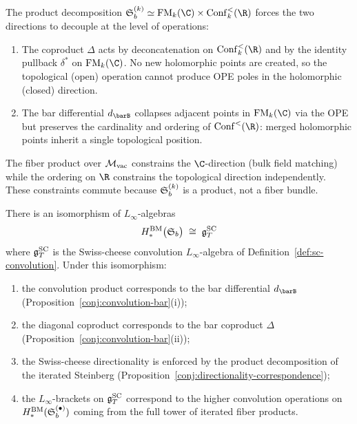 \begin{remark}[Evidence]
The product decomposition
$\Steinb_b^{(k)} \simeq \FM_k(\C) \times \Conf_k^{<}(\R)$
forces the two directions to decouple at the level of operations:
\begin{enumerate}[label=(\roman*)]
\item The coproduct $\Delta$ acts by deconcatenation on
 $\Conf_k^{<}(\R)$ and by the identity pullback $\delta^*$ on
 $\FM_k(\C)$. No new holomorphic points are created, so the
 topological (open) operation cannot produce OPE poles in the
 holomorphic (closed) direction.
\item The bar differential $d_{\barB}$ collapses adjacent points
 in $\FM_k(\C)$ via the OPE but preserves the cardinality and
 ordering of $\Conf^{<}(\R)$: merged holomorphic points inherit
 a single topological position.
\end{enumerate}
The fiber product over $\mathcal M_{\mathrm{vac}}$ constrains the
$\C$-direction (bulk field matching) while the ordering on $\R$
constrains the topological direction independently. These
constraints commute because $\mathfrak{S}_b^{(k)}$ is a product, not
a fiber bundle.
\end{remark}

\begin{conjecture}
\label{conj:steinberg-convolution}
There is an isomorphism of $L_\infty$-algebras
\begin{equation}\label{eq:steinberg-sc-iso}
H_*^{\mathrm{BM}}\bigl(\mathfrak{S}_b\bigr)
\;\cong\;
\mathfrak{g}^{\mathrm{SC}}_T
\end{equation}
where $\mathfrak{g}^{\mathrm{SC}}_T$ is the Swiss-cheese convolution $L_\infty$-algebra
of Definition~\textup{\ref{def:sc-convolution}}. Under this
isomorphism:
\begin{enumerate}[label=\textup{(\roman*)},leftmargin=2em]
\item the convolution product corresponds to the bar differential
 $d_{\barB}$ \textup{(}Proposition~\textup{\ref{conj:convolution-bar}(i)}\textup{)};
\item the diagonal coproduct corresponds to the bar coproduct
 $\Delta$ \textup{(}Proposition~\textup{\ref{conj:convolution-bar}(ii)}\textup{)};
\item the Swiss-cheese directionality is enforced by the product
 decomposition of the iterated Steinberg
 \textup{(}Proposition~\textup{\ref{conj:directionality-correspondence}}\textup{)};
\item the $L_\infty$-brackets on $\mathfrak{g}^{\mathrm{SC}}_T$ correspond to the higher
 convolution operations on $H_*^{\mathrm{BM}}(\mathfrak{S}_b^{(\bullet)})$
 coming from the full tower of iterated fiber products.
\end{enumerate}
\end{conjecture}

